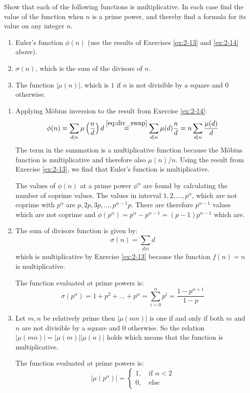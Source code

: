 \begin{exercise}
    \label{ex:2-15}
    Show that each of the following functions is multiplicative. In each case find the value of the function when $n$ is a prime power, and thereby find a formula for its value on any integer $n$.
    \begin{enumerate}[label=(\alph*)]
        \item Euler's function $\phi(n)$ (use the results of Exercises \ref{ex:2-13} and \ref{ex:2-14} above).
        \item $\sigma(n)$, which is the sum of the divisors of $n$.
        \item The function $|\mu(n)|$, which is $1$ if $n$ is not divisible by a square and $0$ otherwise.
    \end{enumerate}
\end{exercise}
\begin{solution}
    \begin{enumerate}[label=(\alph*)]
        \item Applying M{\"o}bius inversion to the result from Exercise \ref{ex:2-14}:
        \[
            \phi(n) = \sum_{d\vert n} \mu\left(\frac{n}{d}\right) d \overset{\eqref{eq:div_swap}}{=} \sum_{d\vert n} \mu(d) \frac{n}{d} = n \sum_{d\vert n} \frac{\mu(d)}{d}
        \]
        The term in the summation is a multiplicative function because the M{\"o}bius function is multiplicative and therefore also $\mu(n)/n$. Using the result from Exercise \ref{ex:2-13}, we find that Euler's function is multiplicative.

        The values of $\phi(n)$ at a prime power $\phi^\alpha$ are found by calculating the number of coprime values. The values in interval $1, 2, \ldots, p^\alpha$, which are not coprime with $p^\alpha$ are $p, 2p, 3p, \ldots, p^{\alpha - 1}p$. There are therefore $p^{\alpha -1}$ values which are not coprime and $\phi(p^\alpha) = p^\alpha - p^{\alpha - 1} = (p-1)p^{\alpha - 1}$ which are.
        \item The sum of divisors function is given by:
        \[
            \sigma(n) = \sum_{d\vert n} d
        \]
        which is multiplicative by Exercise \ref{ex:2-13} because the function $f(n) = n$ is multiplicative.

        The function evaluated at prime powers is:
        \[
            \sigma(p^\alpha) = 1 + p^2 + \ldots + p^\alpha = \sum_{i=0}^\alpha p^i = \frac{1-p^{\alpha+1}}{1-p}
        \]
        \item Let $m,n$ be relatively prime then $|\mu(mn)|$ is one if and only if both $m$ and $n$ are not divisible by a square and $0$ otherwise. So the relation $|\mu(mn)| = |\mu(m)| |\mu(n)|$ holds which means that the function is multiplicative.
        
        The function evaluated at prime powers is:
        \[
            |\mu(p^\alpha)| = \begin{cases}
                1, \quad \text{if $\alpha < 2$} \\
                0, \quad \text{else}
            \end{cases}
        \]  
    \end{enumerate}
\end{solution}

